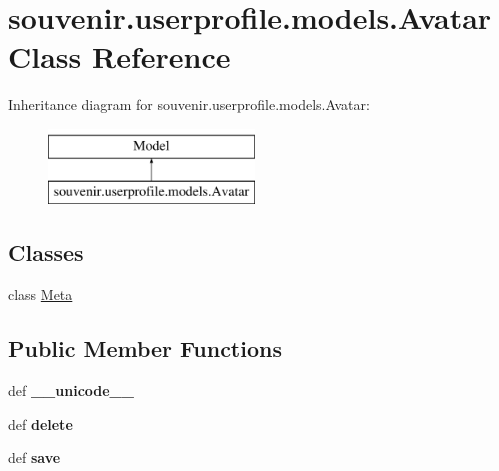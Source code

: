 \hypertarget{classsouvenir_1_1userprofile_1_1models_1_1Avatar}{\section{souvenir.\-userprofile.\-models.\-Avatar Class Reference}
\label{classsouvenir_1_1userprofile_1_1models_1_1Avatar}
}
Inheritance diagram for souvenir.\-userprofile.\-models.\-Avatar\-:\begin{figure}[H]
\begin{center}
\leavevmode
\includegraphics[height=2.000000cm]{classsouvenir_1_1userprofile_1_1models_1_1Avatar}
\end{center}
\end{figure}
\subsection*{Classes}
\begin{DoxyCompactItemize}
\item 
class \hyperlink{classsouvenir_1_1userprofile_1_1models_1_1Avatar_1_1Meta}{Meta}
\end{DoxyCompactItemize}
\subsection*{Public Member Functions}
\begin{DoxyCompactItemize}
\item 
\hypertarget{classsouvenir_1_1userprofile_1_1models_1_1Avatar_a81ea005b38134b360dd6db4eac8a0e97}{def {\bfseries \-\_\-\-\_\-unicode\-\_\-\-\_\-}}\label{classsouvenir_1_1userprofile_1_1models_1_1Avatar_a81ea005b38134b360dd6db4eac8a0e97}

\item 
\hypertarget{classsouvenir_1_1userprofile_1_1models_1_1Avatar_a075bf1a0412f5f3be527fcb3d3ff02a7}{def {\bfseries delete}}\label{classsouvenir_1_1userprofile_1_1models_1_1Avatar_a075bf1a0412f5f3be527fcb3d3ff02a7}

\item 
\hypertarget{classsouvenir_1_1userprofile_1_1models_1_1Avatar_a1f8e57f0214f58e73edba569b1712306}{def {\bfseries save}}\label{classsouvenir_1_1userprofile_1_1models_1_1Avatar_a1f8e57f0214f58e73edba569b1712306}

\end{DoxyCompactItemize}
